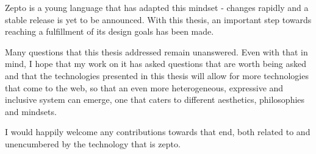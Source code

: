 \documentclass[oneside,11pt,xetex]{scrbook}
\begin{document}
Zepto is a young language that has adapted this mindset -
changes rapidly and a stable release is yet to be announced.
With this thesis, an important step towards reaching a fulfillment
of its design goals has been made.

Many questions that this thesis addressed remain unanswered.
Even with that in mind, I hope that my work on it has asked
questions that are worth being asked and that the technologies
presented in this thesis will allow for more technologies that
come to the web, so that an even more heterogeneous,
expressive and inclusive system can emerge, one that
caters to different aesthetics, philosophies and mindsets.

I would happily welcome any contributions towards that
end, both related to and unencumbered by the technology
that is zepto.



\backmatter


\printbibliography[title=References,heading=bibintoc]
\end{document}
